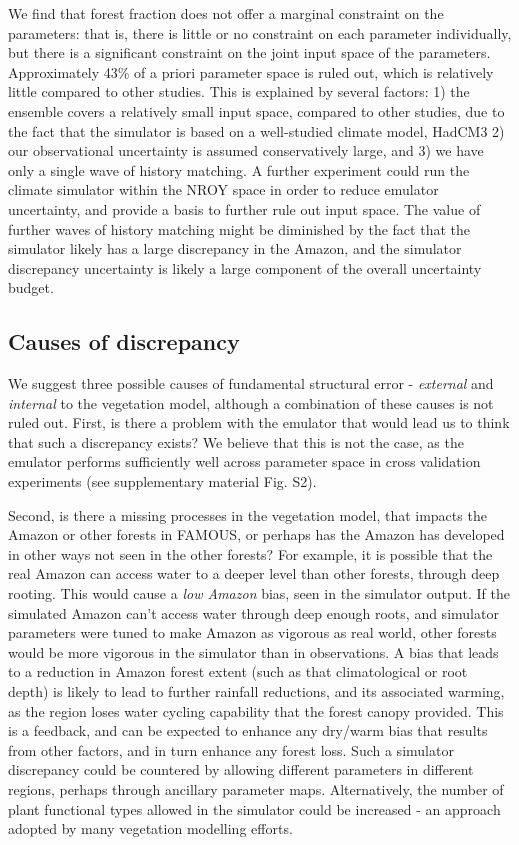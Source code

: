 \documentclass[esd, manuscript]{copernicus}
\begin{document}
We find that forest fraction does not offer a marginal constraint on the parameters: that is, there is little or no constraint on each parameter individually, but there is a significant constraint on the joint input space of the parameters. Approximately 43\% of a priori parameter space is ruled out, which is relatively little compared to other studies. This is explained by several factors: 1) the ensemble covers a relatively small input space, compared to other studies, due to the fact that the simulator is based on a well-studied climate model, HadCM3 2) our observational uncertainty is assumed conservatively large, and 3) we have only a single wave of history matching. A further experiment could run the climate simulator within the NROY space in order to reduce emulator uncertainty, and provide a basis to further rule out input space. The value of further waves of history matching might be diminished by the fact that the simulator likely has a large discrepancy in the Amazon, and the simulator discrepancy uncertainty is likely a large component of the overall uncertainty budget.

\subsection{Causes of discrepancy}\label{ssec:causes}
We suggest three possible causes of fundamental structural error - \emph{external} and \emph{internal} to the vegetation model, although a combination of these causes is not ruled out. First, is there a problem with the emulator that would lead us to think that such a discrepancy exists? We believe that this is not the case, as the emulator performs sufficiently well across parameter space in cross validation experiments (see supplementary material Fig. S2).

Second, is there a missing processes in the vegetation model, that impacts the Amazon or other forests in FAMOUS, or perhaps has the Amazon has developed in other ways not seen in the other forests? For example, it is possible that the real Amazon can access water to a deeper level than other forests, through deep rooting. This would cause a \emph{low Amazon} bias, seen in the simulator output. If the simulated Amazon can't access water through deep enough roots, and simulator parameters were tuned to make Amazon as vigorous as real world, other forests would be more vigorous in the simulator than in observations. A bias that leads to a reduction in Amazon forest extent (such as that climatological or root depth) is likely to lead to further rainfall reductions, and its associated warming, as the region loses water cycling capability that the forest canopy provided. This is a feedback, and can be expected to enhance any dry/warm bias that results from other factors, and in turn enhance any forest loss. Such a simulator discrepancy could be countered by allowing different parameters in different regions, perhaps through ancillary parameter maps. Alternatively, the number of plant functional types allowed in the simulator could be increased - an approach adopted by many vegetation modelling efforts.
\end{document}
